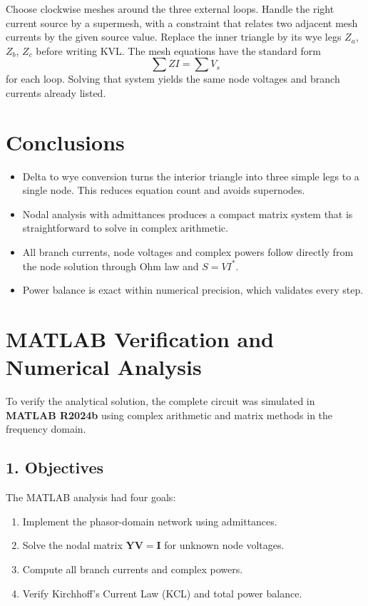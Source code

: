 \documentclass{article}
\begin{document}
Choose clockwise meshes around the three external loops. Handle the right current source by a supermesh, with a constraint that relates two adjacent mesh currents by the given source value. Replace the inner triangle by its wye legs $Z_a$, $Z_b$, $Z_c$ before writing KVL. The mesh equations have the standard form
\[
\sum Z I = \sum V_s
\]
for each loop. Solving that system yields the same node voltages and branch currents already listed.

\section*{Conclusions}
\begin{itemize}
\item Delta to wye conversion turns the interior triangle into three simple legs to a single node. This reduces equation count and avoids supernodes.
\item Nodal analysis with admittances produces a compact matrix system that is straightforward to solve in complex arithmetic.
\item All branch currents, node voltages and complex powers follow directly from the node solution through Ohm law and $S = VI^{*}$.
\item Power balance is exact within numerical precision, which validates every step.
\end{itemize}







\section*{MATLAB Verification and Numerical Analysis}

To verify the analytical solution, the complete circuit was simulated in \textbf{MATLAB R2024b}
using complex arithmetic and matrix methods in the frequency domain.

\subsection*{1. Objectives}
The MATLAB analysis had four goals:
\begin{enumerate}
    \item Implement the phasor-domain network using admittances.
    \item Solve the nodal matrix $\mathbf{Y}\mathbf{V} = \mathbf{I}$ for unknown node voltages.
    \item Compute all branch currents and complex powers.
    \item Verify Kirchhoff's Current Law (KCL) and total power balance.
\end{enumerate}
\end{document}
